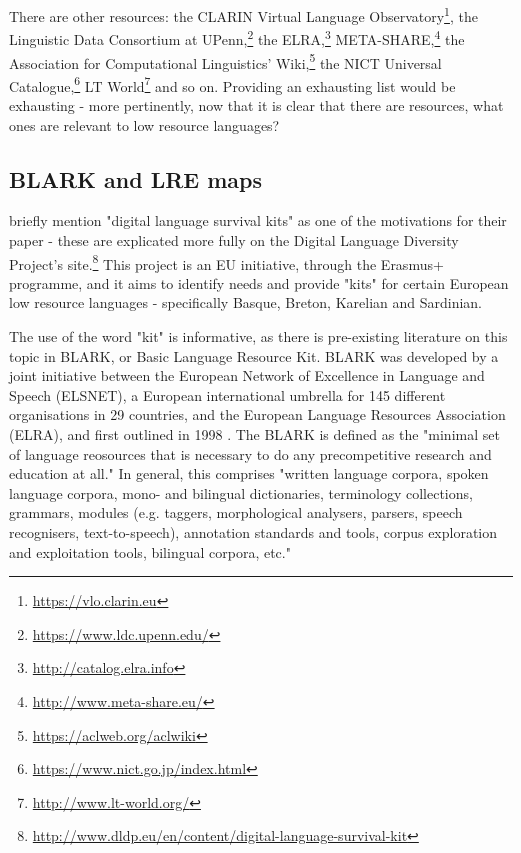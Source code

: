 \begin{itemize}


\end{itemize}

There are other resources: the CLARIN Virtual Language Observatory\footnote{\href{https://vlo.clarin.eu}{https://vlo.clarin.eu}}, the Linguistic Data Consortium at UPenn,\footnote{\href{https://www.ldc.upenn.edu/}{https://www.ldc.upenn.edu/}} the ELRA,\footnote{\href{http://catalog.elra.info}{http://catalog.elra.info}} META-SHARE,\footnote{\href{http://www.meta-share.eu/}{http://www.meta-share.eu/}} the Association for Computational Linguistics' Wiki,\footnote{\href{https://aclweb.org/aclwiki}{https://aclweb.org/aclwiki}} the NICT Universal Catalogue,\footnote{\href{https://www.nict.go.jp/index.html}{https://www.nict.go.jp/index.html}} LT World\footnote{\href{http://www.lt-world.org/}{http://www.lt-world.org/}} and so on. Providing an exhausting list would be exhausting - more pertinently, now that it is clear that there are resources, what ones are relevant to low resource languages?

\subsection{BLARK and LRE maps}
\label{subsec:blark-and-lre-maps}

\citet{soria2017digital} briefly mention "digital language survival kits" as one of the motivations for their paper - these are explicated more fully on the Digital Language Diversity Project's site.\footnote{\href{http://www.dldp.eu/en/content/digital-language-survival-kit}{http://www.dldp.eu/en/content/digital-language-survival-kit}} This project is an EU initiative, through the Erasmus+ programme, and it aims to identify needs and provide "kits" for certain European low resource languages - specifically Basque, Breton, Karelian and Sardinian.

The use of the word "kit" is informative, as there is pre-existing literature on this topic in BLARK, or Basic Language Resource Kit. BLARK was developed by a joint initiative between the European Network of Excellence in Language and Speech (ELSNET), a European international umbrella for 145 different organisations in 29 countries, and the European Language Resources Association (ELRA), and first outlined in 1998 \citep{krauwer1998elsnet}. The BLARK is defined as the "minimal set of language reosources that is necessary to do any precompetitive research and education at all." \citep[4]{krauwer2003basic} In general, this comprises "written language corpora, spoken language corpora, mono- and bilingual dictionaries, terminology collections, grammars, modules (e.g. taggers, morphological analysers, parsers, speech recognisers, text-to-speech), annotation standards and tools, corpus exploration and exploitation tools, bilingual corpora, etc." 

